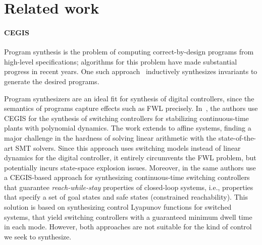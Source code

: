 \documentclass[runningheads,a4paper]{llncs}
\begin{document}


\section{Related work}
\label{sec:relw}

\paragraph{CEGIS}

Program synthesis is the problem of computing correct-by-design programs
from high-level specifications; algorithms for this problem have made
substantial progress in recent years.  One such
approach~\cite{itzhaky2010simple} inductively synthesizes invariants to
generate the desired programs.

Program synthesizers are an ideal fit for synthesis of %
digital controllers, since the semantics of programs capture effects such as
FWL precisely.  In~\cite{DBLP:conf/cdc/RavanbakhshS15}, the authors use
CEGIS for the synthesis of switching controllers for stabilizing
continuous-time plants with polynomial dynamics.  The work extends to affine
systems, finding a major challenge in the hardness of solving linear
arithmetic with the state-of-the-art SMT solvers.  Since this approach uses
switching models instead of linear dynamics for the digital controller, it
entirely circumvents the FWL problem, but potentially incurs state-space
explosion issues.  Moreover, in \cite{DBLP:conf/emsoft/RavanbakhshS16} the
same authors use a CEGIS-based approach for synthesizing continuous-time
switching controllers that guarantee \emph{reach-while-stay} properties of
closed-loop systems, i.e., properties that specify a set of goal states and
safe states (constrained reachability).  This solution is based on
synthesizing control Lyapunov functions for switched systems, that yield
switching controllers with a guaranteed minimum dwell time in each mode. 
However, both approaches are not suitable for the kind of control we seek to
synthesize.
\end{document}
